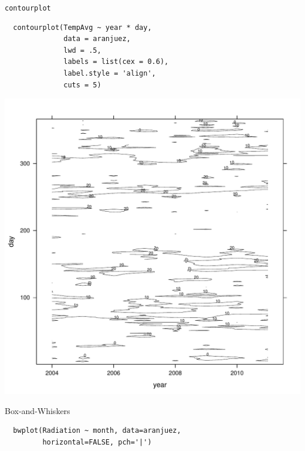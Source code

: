 \documentclass[xcolor={usenames,svgnames,dvipsnames}]{beamer}
\begin{document}
\begin{frame}[fragile,label=sec-2-1-38]{\texttt{contourplot}}
 \lstset{language=R,label= ,caption= ,numbers=none}
\begin{lstlisting}
  contourplot(TempAvg ~ year * day,
              data = aranjuez,
              lwd = .5,
              labels = list(cex = 0.6),
              label.style = 'align',
              cuts = 5)
\end{lstlisting}
\end{frame}

\begin{frame}[label=sec-2-1-39]{}
\includegraphics[width=.9\linewidth]{figs/contourplot.pdf}
\end{frame}

\begin{frame}[fragile,label=sec-2-1-40]{Box-and-Whiskers}
 \lstset{language=R,label= ,caption= ,numbers=none}
\begin{lstlisting}
  bwplot(Radiation ~ month, data=aranjuez,
         horizontal=FALSE, pch='|')
\end{lstlisting}
\end{frame}
\end{document}
